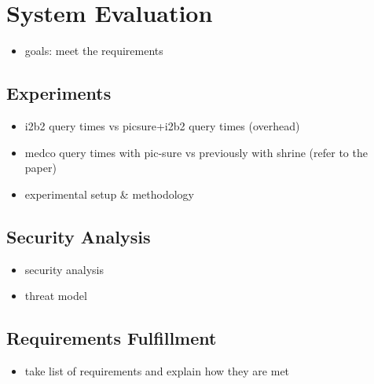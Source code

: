\chapter{System Evaluation}
\label{sec:evaluation}


\begin{itemize}
    \item goals: meet the requirements
\end{itemize}

\section{Experiments}


\begin{itemize}
    \item i2b2 query times vs picsure+i2b2 query times (overhead)
    \item medco query times with pic-sure vs previously with shrine (refer to the paper)
    \item experimental setup & methodology
\end{itemize}

\section{Security Analysis}
\begin{itemize}
    \item security analysis
    \item threat model
\end{itemize}






\section{Requirements Fulfillment}
\begin{itemize}
    \item take list of requirements and explain how they are met
\end{itemize}

